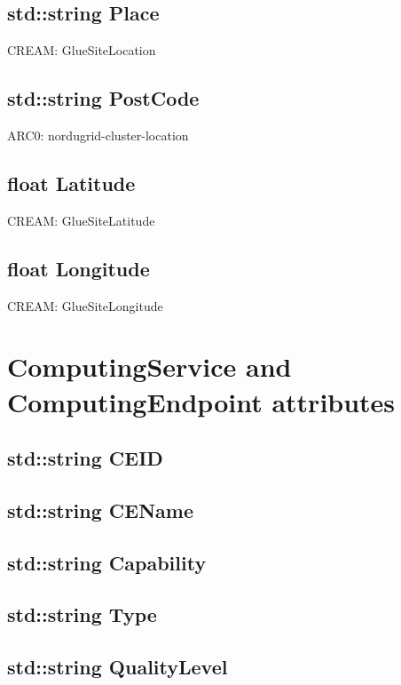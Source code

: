 \documentclass{book}
\begin{document}
\subsection*{std::string Place}

CREAM: GlueSiteLocation

\subsection*{std::string PostCode}

ARC0: nordugrid-cluster-location

\subsection*{float Latitude}

CREAM: GlueSiteLatitude

\subsection*{float Longitude}

CREAM: GlueSiteLongitude

\section{ComputingService and ComputingEndpoint attributes}

\subsection*{std::string CEID}

\subsection*{std::string CEName}

\subsection*{std::string Capability}

\subsection*{std::string Type}

\subsection*{std::string QualityLevel}
\end{document}
